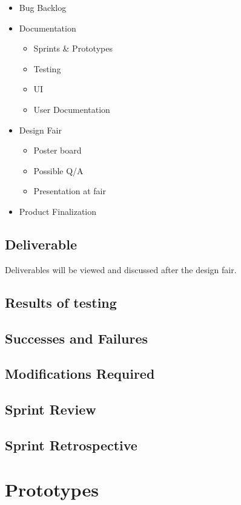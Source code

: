 \begin{itemize}
	\item Bug Backlog
	\item Documentation		
\begin{itemize}
    \item Sprints & Prototypes
    \item Testing
    \item UI
    \item User Documentation
\end{itemize}
	\item Design Fair	
\begin{itemize}
    \item Poster board
    \item Possible Q/A
    \item Presentation at fair
\end{itemize}
	\item Product Finalization
\end{itemize}

\subsection{Deliverable}

Deliverables will be viewed and discussed after the design fair.

\subsection{Results of testing}


\subsection{Successes and Failures}


\subsection{Modifications Required}


\subsection{Sprint Review}


\subsection{Sprint Retrospective}


\section{Prototypes}

